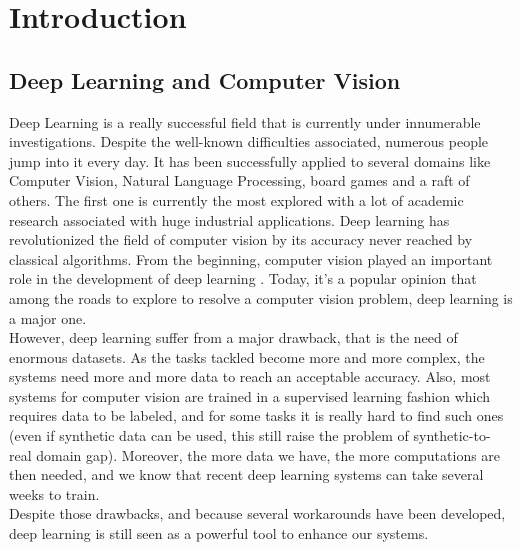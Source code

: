 \documentclass[12pt, a4paper]{report}
\begin{document}
	\makeutbmfrontcover{}

	{
	\hypersetup{linkcolor=black}
	\tableofcontents
	}
	
	\printglossary
	
	\chapter{Introduction}
	\section{Deep Learning and Computer Vision}
	Deep Learning is a really successful field that is currently under innumerable investigations.
	Despite the well-known difficulties associated, numerous people jump into it every day.
	It has been successfully applied to several domains like Computer Vision, Natural Language Processing, board games and a raft of others.
	The first one is currently the most explored with a lot of academic research associated with huge industrial applications.
	Deep learning has revolutionized the field of computer vision by its accuracy never reached by classical algorithms.
	From the beginning, computer vision played an important role in the development of deep learning \cite{lecun_zipcode,lecun_mnist}.
	Today, it's a popular opinion that among the roads to explore to resolve a computer vision problem, deep learning is a major one.\\
	However, deep learning suffer from a major drawback, that is the need of enormous datasets.
	As the tasks tackled become more and more complex, the systems need more and more data to reach an acceptable accuracy.
	Also, most systems for computer vision are trained in a supervised learning fashion which requires data to be labeled, and for some tasks it is really hard to find such ones (even if synthetic data can be used, this still raise the problem of synthetic-to-real domain gap).
	Moreover, the more data we have, the more computations are then needed, and we know that recent deep learning systems can take several weeks to train.\\
	
	Despite those drawbacks, and because several workarounds have been developed, deep learning is still seen as a powerful tool to enhance our systems.
\end{document}
